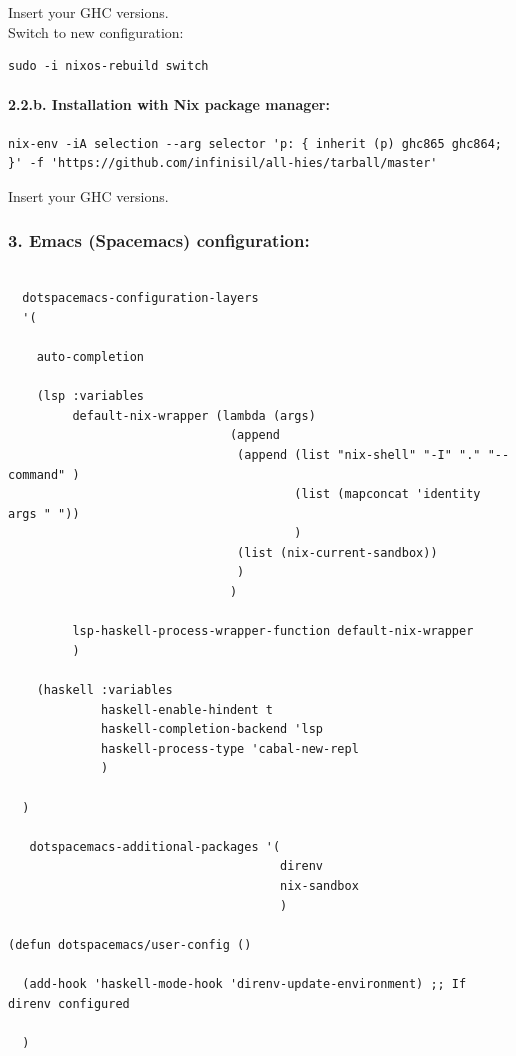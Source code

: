 \documentclass[11pt]{article}
\begin{document}
Insert your GHC versions.\\

Switch to new configuration:\\

\begin{verbatim}
sudo -i nixos-rebuild switch
\end{verbatim}

\paragraph{2.2.b. Installation with Nix package manager:}
\label{sec:org065d0c8}

\begin{verbatim}
nix-env -iA selection --arg selector 'p: { inherit (p) ghc865 ghc864; }' -f 'https://github.com/infinisil/all-hies/tarball/master'
\end{verbatim}

Insert your GHC versions.\\

\subsubsection{3. Emacs (Spacemacs) configuration:}
\label{sec:orgecd3aae}

\begin{verbatim}

  dotspacemacs-configuration-layers
  '(

    auto-completion

    (lsp :variables
         default-nix-wrapper (lambda (args)
                               (append
                                (append (list "nix-shell" "-I" "." "--command" )
                                        (list (mapconcat 'identity args " "))
                                        )
                                (list (nix-current-sandbox))
                                )
                               )

         lsp-haskell-process-wrapper-function default-nix-wrapper
         )

    (haskell :variables
             haskell-enable-hindent t
             haskell-completion-backend 'lsp
             haskell-process-type 'cabal-new-repl
             )

  )

   dotspacemacs-additional-packages '(
                                      direnv
                                      nix-sandbox
                                      )

(defun dotspacemacs/user-config ()

  (add-hook 'haskell-mode-hook 'direnv-update-environment) ;; If direnv configured

  )
\end{verbatim}
\end{document}
